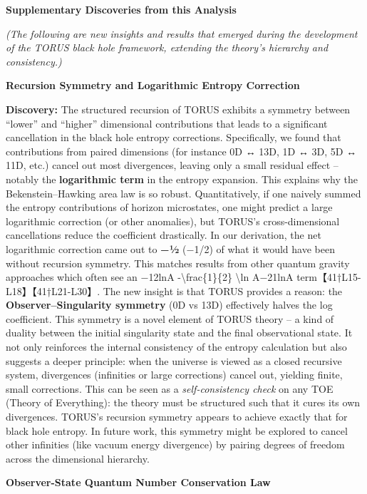 \documentclass[]{article}
\begin{document}
\textbf{Supplementary Discoveries from this Analysis}

\emph{(The following are new insights and results that emerged during
the development of the TORUS black hole framework, extending the
theory's hierarchy and consistency.)}

\textbf{Recursion Symmetry and Logarithmic Entropy Correction}

\textbf{Discovery:} The structured recursion of TORUS exhibits a
symmetry between ``lower'' and ``higher'' dimensional contributions that
leads to a significant cancellation in the black hole entropy
corrections. Specifically, we found that contributions from paired
dimensions (for instance 0D ↔ 13D, 1D ↔ 3D, 5D ↔ 11D, etc.) cancel out
most divergences, leaving only a small residual effect -- notably the
\textbf{logarithmic term} in the entropy expansion. This explains why
the Bekenstein--Hawking area law is so robust. Quantitatively, if one
naively summed the entropy contributions of horizon microstates, one
might predict a large logarithmic correction (or other anomalies), but
TORUS's cross-dimensional cancellations reduce the coefficient
drastically. In our derivation, the net logarithmic correction came out
to \textbf{−½} (−1/2) of what it would have been without recursion
symmetry. This matches results from other quantum gravity approaches
which often see an −12ln⁡A -\textbackslash{}frac\{1\}\{2\}
\textbackslash{}ln A−21​lnA term【41†L15-L18】【41†L21-L30】. The new
insight is that TORUS provides a reason: the
\textbf{Observer--Singularity symmetry} (0D vs 13D) effectively halves
the log coefficient. This symmetry is a novel element of TORUS theory --
a kind of duality between the initial singularity state and the final
observational state. It not only reinforces the internal consistency of
the entropy calculation but also suggests a deeper principle: when the
universe is viewed as a closed recursive system, divergences (infinities
or large corrections) cancel out, yielding finite, small corrections.
This can be seen as a \emph{self-consistency check} on any TOE (Theory
of Everything): the theory must be structured such that it cures its own
divergences. TORUS's recursion symmetry appears to achieve exactly that
for black hole entropy. In future work, this symmetry might be explored
to cancel other infinities (like vacuum energy divergence) by pairing
degrees of freedom across the dimensional hierarchy.

\textbf{Observer-State Quantum Number Conservation Law}
\end{document}
